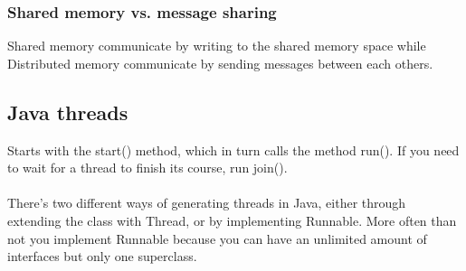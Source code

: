 \subsubsection{Shared memory vs. message sharing}
Shared memory communicate by writing to the shared memory space while\\
Distributed memory communicate by sending messages between each others.

\subsection{Java threads}
Starts with the start() method, which in turn calls the method run(). If you need to wait for a thread to finish its course, run join().\\
\\
There's two different ways of generating threads in Java, either through extending the class with Thread, or by implementing Runnable. More often than not you implement Runnable because you can have an unlimited amount of interfaces but only one superclass.

